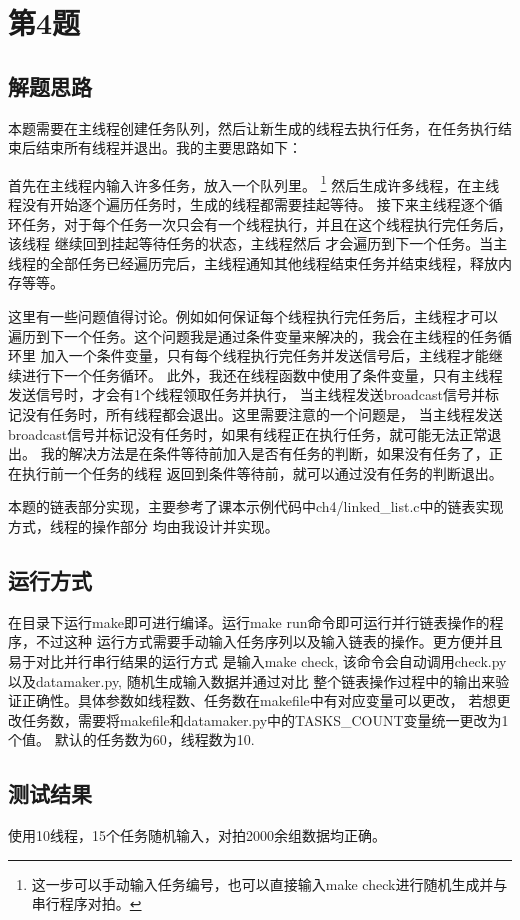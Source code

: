 \documentclass[UTF8]{article}
\begin{document}
\section{第4题}
\subsection{解题思路}
本题需要在主线程创建任务队列，然后让新生成的线程去执行任务，在任务执行结束后结束所有线程并退出。我的主要思路如下：

首先在主线程内输入许多任务，放入一个队列里。
\footnote{这一步可以手动输入任务编号，也可以直接输入make check进行随机生成并与串行程序对拍。}
然后生成许多线程，在主线程没有开始逐个遍历任务时，生成的线程都需要挂起等待。
接下来主线程逐个循环任务，对于每个任务一次只会有一个线程执行，并且在这个线程执行完任务后，该线程
继续回到挂起等待任务的状态，主线程然后
才会遍历到下一个任务。当主线程的全部任务已经遍历完后，主线程通知其他线程结束任务并结束线程，释放内存等等。

这里有一些问题值得讨论。例如如何保证每个线程执行完任务后，主线程才可以
遍历到下一个任务。这个问题我是通过条件变量来解决的，我会在主线程的任务循环里
加入一个条件变量，只有每个线程执行完任务并发送信号后，主线程才能继续进行下一个任务循环。
此外，我还在线程函数中使用了条件变量，只有主线程发送信号时，才会有1个线程领取任务并执行，
当主线程发送broadcast信号并标记没有任务时，所有线程都会退出。这里需要注意的一个问题是，
当主线程发送broadcast信号并标记没有任务时，如果有线程正在执行任务，就可能无法正常退出。
我的解决方法是在条件等待前加入是否有任务的判断，如果没有任务了，正在执行前一个任务的线程
返回到条件等待前，就可以通过没有任务的判断退出。

本题的链表部分实现，主要参考了课本示例代码中ch4/linked\_list.c中的链表实现方式，线程的操作部分
均由我设计并实现。

\subsection{运行方式}
在目录下运行make即可进行编译。运行make run命令即可运行并行链表操作的程序，不过这种
运行方式需要手动输入任务序列以及输入链表的操作。更方便并且易于对比并行串行结果的运行方式
是输入make check, 该命令会自动调用check.py以及datamaker.py, 随机生成输入数据并通过对比
整个链表操作过程中的输出来验证正确性。具体参数如线程数、任务数在makefile中有对应变量可以更改，
若想更改任务数，需要将makefile和datamaker.py中的TASKS\_COUNT变量统一更改为1个值。
默认的任务数为60，线程数为10.
\subsection{测试结果}
使用10线程，15个任务随机输入，对拍2000余组数据均正确。
\end{document}
